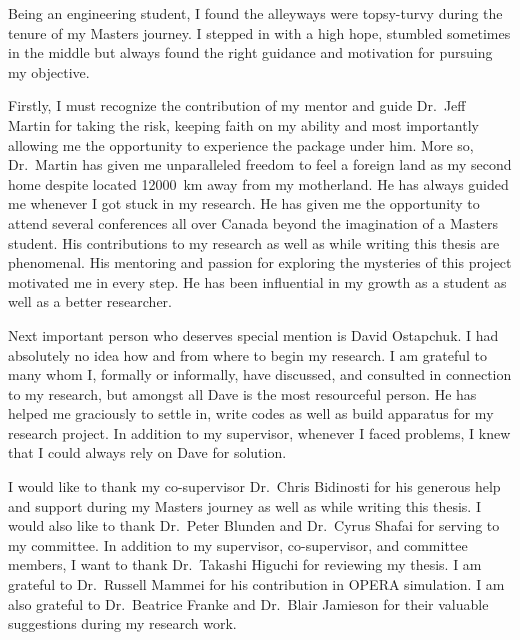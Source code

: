 \newpage
\tableofcontents
{}
\listoffigures
\listoftables

\begin{acknowledgments}
\vspace{2em}

Being an engineering student, I found the alleyways were topsy-turvy during the tenure of my Masters journey. I stepped in with a high hope, stumbled sometimes in the middle but always found the right guidance and motivation for pursuing my objective. 

Firstly, I must recognize the contribution of my mentor and guide Dr.~Jeff Martin for taking the risk, keeping faith on my ability and most importantly allowing me the opportunity to experience the package under him. More so, Dr.~Martin has given me unparalleled freedom to feel a foreign land as my second home despite located 12000~km away from my motherland. He has always guided me whenever I got stuck in my research. He has given me the opportunity to attend several conferences all over Canada beyond the imagination of a Masters student. His contributions to my research as well as while writing this thesis are phenomenal. His mentoring and passion for exploring the mysteries of this project motivated me in every step. He has been influential in my growth as a student as well as a better researcher.  



Next important person who deserves special mention is David Ostapchuk. I had absolutely no idea how and from where to begin my research. I am grateful to many whom I, formally or informally, have discussed, and consulted in connection to my research, but amongst all Dave is the most resourceful person. He has helped me graciously to settle in, write codes as well as build apparatus for my research project. In addition to my supervisor, whenever I faced problems, I knew that I could always rely on Dave for solution.


I would like to thank my co-supervisor Dr.~Chris Bidinosti for his generous help and support during my Masters journey as well as while writing this thesis. I would also like to thank Dr.~Peter Blunden and Dr.~Cyrus Shafai for serving to my committee. In addition to my supervisor, co-supervisor, and committee members, I want to thank Dr.~Takashi Higuchi for reviewing my thesis. I am grateful to Dr.~Russell Mammei for his contribution in OPERA simulation. I am also grateful to Dr.~Beatrice Franke and Dr.~Blair Jamieson for their valuable suggestions during my research work. 



\end{acknowledgments}
